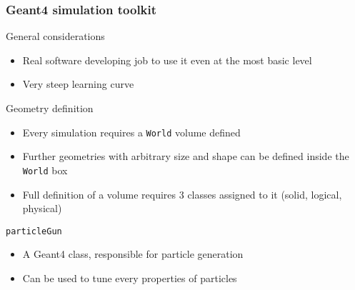 \begin{frame}
\frametitle{Geant4 simulation toolkit}

\begin{alertblock}{General considerations}
	\begin{itemize}
		\item Real software developing job to use it even at the most basic level
		\item Very steep learning curve
	\end{itemize}
\end{alertblock}

\pause

\begin{block}{Geometry definition}
	\begin{itemize}
		\item Every simulation requires a \texttt{World} volume defined
		\item Further geometries with arbitrary size and shape can be defined inside the \texttt{World} box
		\item Full definition of a volume requires $3$ classes assigned to it (solid, logical, physical)
	\end{itemize}
\end{block}

\pause

\begin{block}{\texttt{particleGun}}
	\begin{itemize}
		\item A Geant4 class, responsible for particle generation
		\item Can be used to tune every properties of particles
	\end{itemize}
\end{block}

\end{frame}